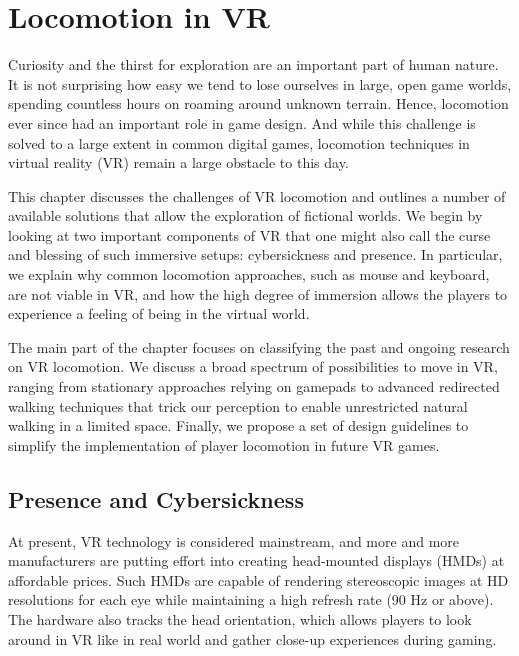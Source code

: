 \chapter{Locomotion in VR}
\label{sec:locomotion}




Curiosity and the thirst for exploration are an important part of human nature. It is not surprising how easy we tend to lose ourselves in large, open game worlds, spending countless hours on roaming around unknown terrain. Hence, locomotion  ever since had an important role in game design. And while this challenge is solved to a large extent in common digital games, locomotion techniques in virtual reality (VR) remain a large obstacle to this day.

This chapter discusses the challenges of VR locomotion and outlines a number of available solutions that allow the exploration of fictional worlds. We begin by looking at two important components of VR that one might also call the curse and blessing of such immersive setups: cybersickness and presence. In particular, we explain why common locomotion approaches, such as mouse and keyboard, are not viable in VR, and how the high degree of immersion allows the players to experience a feeling of being in the virtual world.

The main part of the chapter focuses on classifying the past and ongoing research on VR locomotion. We discuss a broad spectrum of possibilities to move in VR, ranging from stationary approaches relying on gamepads to advanced redirected walking techniques that trick our perception to enable unrestricted natural walking in a limited space. Finally, we propose a set of design guidelines to simplify the implementation of player locomotion in future VR games.





\section{Presence and Cybersickness}

At present, VR technology is considered mainstream, and more and more manufacturers are putting effort into creating head-mounted displays (HMDs) at affordable prices. Such HMDs are capable of rendering stereoscopic images at HD resolutions for each eye while maintaining a high refresh rate (90 Hz or above). The hardware also tracks 
the head orientation, which allows players to look around in VR like in real world and gather 
close-up experiences during gaming.

